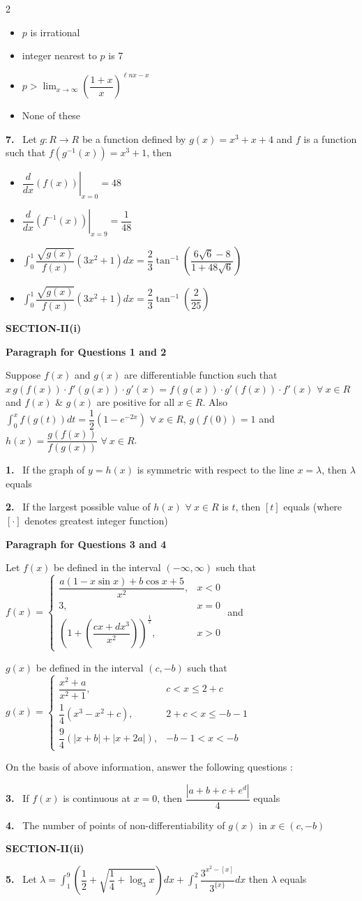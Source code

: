 \documentclass[10pt]{extarticle}
\newcommand{\sect}[1]{\par\smallskip\noindent\textbf{#1}\par}
\newcommand{\qn}[1]{\par\smallskip\noindent\textbf{#1.}~}
\newcommand{\paraq}[2]{\par\smallskip\noindent\textbf{Paragraph for Questions #1 and #2}\par}
\newenvironment{qoptions}{\begin{itemize}[leftmargin=1.8em,itemsep=1pt,topsep=2pt,label={}]}{\end{itemize}}
\newcommand{\opt}[2]{\item[(#1)] #2}
\begin{document}
\begin{multicols}{2}
\begin{qoptions}
\opt{A}{$p$ is irrational}
\opt{B}{integer nearest to $p$ is 7}
\opt{C}{$p>\displaystyle\lim_{x\to\infty}\left(\dfrac{1+x}x\right)^{\ell nx-x}$}
\opt{D}{None of these}
\end{qoptions}
\qn{7} Let $g:R\to R$ be a function defined by $g(x)=x^3+x+4$ and $f$ is a function such that $f(g^{-1}(x))=x^3+1$, then
\begin{qoptions}
\opt{A}{$\left.\dfrac d{dx}(f(x))\right|_{x=0}=48$}
\opt{B}{$\left.\dfrac d{dx}\left(f^{-1}(x)\right)\right|_{x=9}=\dfrac1{48}$}
\opt{C}{$\displaystyle\int_0^1\dfrac{\sqrt{g(x)}}{f(x)}\left(3x^2+1\right)dx=\dfrac23\tan^{-1}\left(\dfrac{6\sqrt6-8}{1+48\sqrt6}\right)$}
\opt{D}{$\displaystyle\int_0^1\dfrac{\sqrt{g(x)}}{f(x)}\left(3x^2+1\right)dx=\dfrac23\tan^{-1}\left(\dfrac2{25}\right)$}
\end{qoptions}
\sect{SECTION-II(i)}
\paraq{1}{2}
Suppose $f(x)$ and $g(x)$ are differentiable function such that $x\,g(f(x))\cdot f'(g(x))\cdot g'(x)=f(g(x))\cdot g'(f(x))\cdot f'(x)$ $\forall\ x\in R$ and $f(x)$ \& $g(x)$ are positive for all $x\in R$. Also $\displaystyle\int_0^xf(g(t))dt=\dfrac12(1-e^{-2x})$ $\forall\ x\in R$, $g(f(0))=1$ and $h(x)=\dfrac{g(f(x))}{f(g(x))}$ $\forall\ x\in R$.
\qn{1} If the graph of $y=h(x)$ is symmetric with respect to the line $x=\lambda$, then $\lambda$ equals
\qn{2} If the largest possible value of $h(x)$ $\forall\ x\in R$ is $t$, then $[t]$ equals (where $[\cdot]$ denotes greatest integer function)
\paraq{3}{4}
Let $f(x)$ be defined in the interval $(-\infty,\infty)$ such that $f(x)=\begin{cases}\dfrac{a(1-x\sin x)+b\cos x+5}{x^2},&x<0\\3,&x=0\\\left(1+\left(\dfrac{cx+dx^3}{x^2}\right)\right)^{\frac1x},&x>0\end{cases}$ and

$g(x)$ be defined in the interval $(c,-b)$ such that $g(x)=\begin{cases}\dfrac{x^2+a}{x^2+1},&c<x\leqslant2+c\\\dfrac14\left(x^3-x^2+c\right),&2+c<x\leqslant-b-1\\\dfrac94\left(|x+b|+|x+2a|\right),&-b-1<x<-b\end{cases}$

On the basis of above information, answer the following questions :
\qn{3} If $f(x)$ is continuous at $x=0$, then $\dfrac{\left|a+b+c+e^d\right|}4$ equals
\qn{4} The number of points of non-differentiability of $g(x)$ in $x\in(c,-b)$
\sect{SECTION-II(ii)}
\qn{5} Let $\lambda=\displaystyle\int_1^9\left(\dfrac12+\sqrt{\dfrac14+\log_3x}\right)dx+\int_1^2\dfrac{3^{x^2-[x]}}{3^{\{x\}}}dx$ then $\lambda$ equals


\end{multicols}
\end{document}
